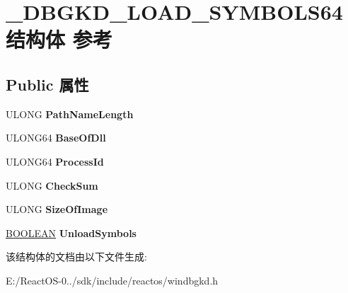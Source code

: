 \hypertarget{struct___d_b_g_k_d___l_o_a_d___s_y_m_b_o_l_s64}{}\section{\+\_\+\+D\+B\+G\+K\+D\+\_\+\+L\+O\+A\+D\+\_\+\+S\+Y\+M\+B\+O\+L\+S64结构体 参考}
\label{struct___d_b_g_k_d___l_o_a_d___s_y_m_b_o_l_s64}
\subsection*{Public 属性}
\begin{DoxyCompactItemize}
\item 
\mbox{\label{struct___d_b_g_k_d___l_o_a_d___s_y_m_b_o_l_s64_a0935201a0956d9bf6430c267f99062b3}} 
U\+L\+O\+NG {\bfseries Path\+Name\+Length}
\item 
\mbox{\label{struct___d_b_g_k_d___l_o_a_d___s_y_m_b_o_l_s64_a34d312f78ea91a60a1421e3c969a5f27}} 
U\+L\+O\+N\+G64 {\bfseries Base\+Of\+Dll}
\item 
\mbox{\label{struct___d_b_g_k_d___l_o_a_d___s_y_m_b_o_l_s64_a71a329d4cd33e8ad9f3d57156c580f78}} 
U\+L\+O\+N\+G64 {\bfseries Process\+Id}
\item 
\mbox{\label{struct___d_b_g_k_d___l_o_a_d___s_y_m_b_o_l_s64_a6a313d51c193de7c3945e486ef979900}} 
U\+L\+O\+NG {\bfseries Check\+Sum}
\item 
\mbox{\label{struct___d_b_g_k_d___l_o_a_d___s_y_m_b_o_l_s64_a805435d301cdf4c2022ed84bdc82f588}} 
U\+L\+O\+NG {\bfseries Size\+Of\+Image}
\item 
\mbox{\label{struct___d_b_g_k_d___l_o_a_d___s_y_m_b_o_l_s64_ab8be07232c773f2ddd95150232e315bf}} 
\hyperlink{_processor_bind_8h_a112e3146cb38b6ee95e64d85842e380a}{B\+O\+O\+L\+E\+AN} {\bfseries Unload\+Symbols}
\end{DoxyCompactItemize}


该结构体的文档由以下文件生成\+:\begin{DoxyCompactItemize}
\item 
E\+:/\+React\+O\+S-\/0../sdk/include/reactos/windbgkd.\+h\end{DoxyCompactItemize}
